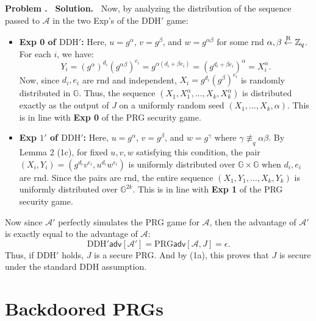\documentclass[12pt]{article}
\theoremstyle{definition}
\newcommand{\addbigskip}{\addvspace{\bigskipamount}}
\newcounter{problemnum}
\newenvironment{problem}
     {\addbigskip \setcounter{partnum}{0}
      \noindent\stepcounter{problemnum}\textbf{Problem
                                             \arabic{problemnum}.\ }}
     {\par\addbigskip}
\newenvironment{solution}
     {\addbigskip
      \noindent\color{blue}\textbf{Solution.\ }}
     {\par\addbigskip}
\newenvironment{solution}
     {\comment}
     {\endcomment}
\newcounter{partnum}
\newcommand{\prg}{\mathit{J}}
\newcommand{\rfrom}{\buildrel{\scriptstyle{\mathrm{R}}}\over{\leftarrow}}
\newcommand{\Z}{\mathbb{Z}}
\newcommand{\G}{\mathbb{G}}
\newcommand{\Adv}{\mathcal{A}}
\newcommand{\PRGadv}{\textrm{PRG}\textsf{adv}}
\newcommand{\DDHprimeadv}{\textrm{DDH}'\textsf{adv}}
\begin{document}
\begin{problem}
\begin{solution}
\noindent Now, by analyzing the distribution of the sequence passed to $\Adv$ in the two Exp's of the $\text{DDH}'$ game:
\begin{itemize}
    \item \textbf{Exp 0 of $\text{DDH}'$:} Here, $u = g^\alpha$, $v = g^\beta$, and $w = g^{\alpha\beta}$ for some rnd $\alpha, \beta \rfrom \Z_q$.\\
    For each $i$, we have:
    \[
    Y_i = (g^\alpha)^{d_i} (g^{\alpha\beta})^{e_i} = g^{\alpha(d_i + \beta e_i)} = (g^{d_i + \beta e_i})^\alpha = X_i^\alpha.
    \]
    Now, since $d_i, e_i$ are rnd and independent, $X_i = g^{d_i} (g^\beta)^{e_i}$ is randomly distributed in $\G$. Thus, the sequence $(X_1, X_1^\alpha, \dots, X_k, X_k^\alpha)$ is distributed exactly as the output of $\prg$ on a uniformly random seed $(X_1, \dots, X_k, \alpha)$. This is in line with \textbf{Exp 0} of the PRG security game.
    
    \item \textbf{Exp $1'$ of $\text{DDH}'$:} Here, $u = g^\alpha$, $v = g^\beta$, and $w = g^\gamma$ where $\gamma \not\equiv_q \alpha\beta$.
    By Lemma 2 (1c), for fixed $u, v, w$ satisfying this condition, the pair $(X_i, Y_i) = (g^{d_i} v^{e_i}, u^{d_i} w^{e_i})$ is uniformly distributed over $\G \times \G$ when $d_i, e_i$ are rnd. Since the pairs are rnd, the entire sequence $(X_1, Y_1, \dots, X_k, Y_k)$ is uniformly distributed over $\G^{2k}$. This is in line with \textbf{Exp 1} of the PRG security game.
\end{itemize}

\noindent Now since $\Adv'$ perfectly simulates the PRG game for $\Adv$, then the advantage of $\Adv'$ is exactly equal to the advantage of $\Adv$:
\[
\DDHprimeadv[\Adv'] = \PRGadv[\Adv, \prg] = \epsilon.
\]
Thus, if $\text{DDH}'$ holds, $\prg$ is a secure PRG. And by (1a), this proves that $\prg$ is secure under the standard DDH assumption.

\end{solution}


\end{problem}



\section*{Backdoored PRGs}
\end{document}
